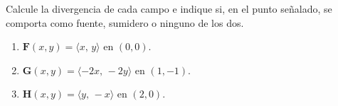 Calcule la divergencia de cada campo e indique si, en el punto señalado, se comporta como fuente, sumidero o ninguno de los dos.
\begin{enumerate}
    \item $\mathbf{F}(x,y)=\langle x,\,y\rangle$ en $(0,0)$.
    \item $\mathbf{G}(x,y)=\langle -2x,\,-2y\rangle$ en $(1,-1)$.
    \item $\mathbf{H}(x,y)=\langle y,\,-x\rangle$ en $(2,0)$.
\end{enumerate}
